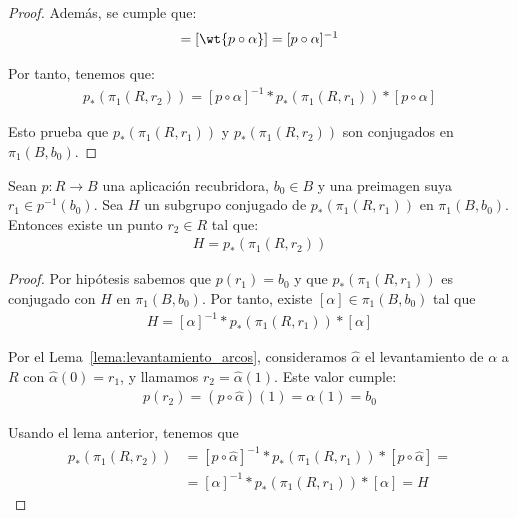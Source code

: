 \begin{lema}
\begin{proof}
        Además, se cumple que:
        \begin{gather*}
            [p\circ \tilde{\alpha}] = [\wt{p\circ \alpha}] = [p\circ \alpha]^{-1}
        \end{gather*}

        Por tanto, tenemos que:
        \begin{gather*}
            p_*(\pi_1(R,r_2)) = [p\circ \alpha]^{-1} \ast p_*(\pi_1(R,r_1)) \ast [p\circ \alpha]
        \end{gather*}

        Esto prueba que $p_*(\pi_1(R,r_1))$ y $p_*(\pi_1(R,r_2))$ son conjugados en $\pi_1(B,b_0)$.
    \end{proof}
\end{lema}

\begin{coro}\label{coro:subgrupos_conjugados}
    Sean $p:R\to B$ una aplicación recubridora, $b_0\in B$ y una preimagen suya $r_1\in p^{-1}(b_0)$. Sea $H$ un subgrupo conjugado de $p_*(\pi_1(R,r_1))$ en $\pi_1(B,b_0)$. Entonces existe un punto $r_2\in R$ tal que:
    \begin{gather*}
        H=p_*(\pi_1(R,r_2))
    \end{gather*}
    \begin{proof}
        Por hipótesis sabemos que $p(r_1)=b_0$ y que $p_*(\pi_1(R,r_1))$ es conjugado con $H$ en $\pi_1(B,b_0)$. Por tanto, existe $[\alpha]\in \pi_1(B,b_0)$ tal que
        \begin{gather*}
            H = [\alpha]^{-1} \ast p_*(\pi_1(R,r_1)) \ast [\alpha]
        \end{gather*}

        Por el Lema~\ref{lema:levantamiento_arcos}, consideramos $\hat{\alpha}$ el levantamiento de $\alpha$ a $R$ con $\hat{\alpha}(0) = r_1$, 
        y llamamos $r_2=\hat{\alpha}(1)$. Este valor cumple:
        \begin{gather*}
            p(r_2) = (p\circ \hat{\alpha})(1) = \alpha(1) = b_0
        \end{gather*}

        Usando el lema anterior, tenemos que 
        \begin{align*}
            p_*(\pi_1(R,r_2)) &= [p\circ \hat{\alpha}]^{-1} \ast p_*(\pi_1(R,r_1)) \ast [p\circ \hat{\alpha}] =\\
            &= [\alpha]^{-1} \ast p_*(\pi_1(R,r_1)) \ast [\alpha] = H
        \end{align*}
    \end{proof}
\end{coro}


